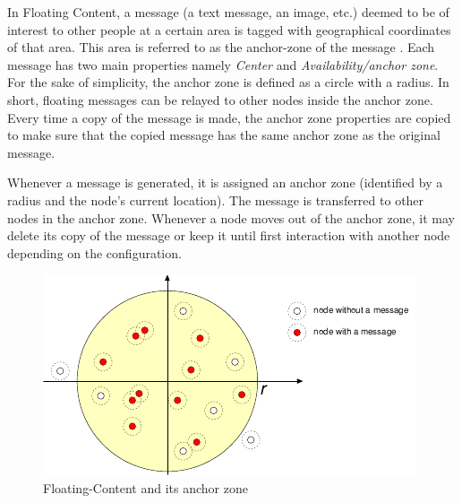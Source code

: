 In Floating Content, a message (a text message, an image, etc.) deemed to be of interest to other people at a certain area is tagged with geographical coordinates of that area. This area is referred to as the anchor-zone of the message \cite{floating-content-1}. Each message has two main properties namely \textit{Center} and \textit{Availability/anchor zone}. For the sake of simplicity, the anchor zone is defined as a circle with a radius. In short, floating messages can be relayed to other nodes inside the anchor zone. Every time a copy of the message is made, the anchor zone properties are copied to make sure that the copied message has the same anchor zone as the original message.

Whenever a message is generated, it is assigned an anchor zone (identified by a radius and the node's current location). The message is transferred to other nodes in the anchor zone. Whenever a node moves out of the anchor zone, it may delete its copy of the message or keep it until first interaction with another node depending on the configuration.
\begin{figure}[h]
\centering
\includegraphics{./figures/anchor-zone}
\caption{Floating-Content and its anchor zone \cite{floating-content}}
\end{figure}
\newpage
